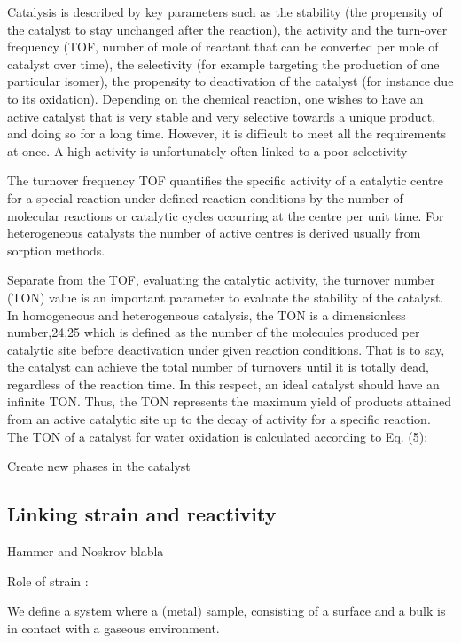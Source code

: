 Catalysis is described by key parameters such as the stability (the propensity of the catalyst to stay unchanged after the reaction), the activity and the turn-over frequency (TOF, number of mole of reactant that can be converted per mole of catalyst over time), the selectivity (for example targeting the production of one particular isomer), the propensity to deactivation of the catalyst (for instance due to its oxidation).
Depending on the chemical reaction, one wishes to have an active catalyst that is very stable and very selective towards a unique product, and doing so for a long time.
However, it is difficult to meet all the requirements at once.
A high activity is unfortunately often linked to a poor selectivity


The turnover frequency TOF quantifies the specific activity of a catalytic centre for a special reaction under defined reaction conditions by the number of molecular reactions or catalytic cycles occurring at the centre per unit time.
For heterogeneous catalysts the number of active centres is derived usually from sorption methods.

Separate from the TOF, evaluating the catalytic activity, the turnover number (TON) value is an important parameter to evaluate the stability of the catalyst. In homogeneous and heterogeneous catalysis, the TON is a dimensionless number,24,25 which is defined as the number of the molecules produced per catalytic site before deactivation under given reaction conditions.
That is to say, the catalyst can achieve the total number of turnovers until it is totally dead, regardless of the reaction time. In this respect, an ideal catalyst should have an infinite TON.
Thus, the TON represents the maximum yield of products attained from an active catalytic site up to the decay of activity for a specific reaction.
The TON of a catalyst for water oxidation is calculated according to Eq. (5):

Create new phases in the catalyst

\subsection{Linking strain and reactivity}



Hammer and Noskrov blabla


Role of strain :

\cite{Kitchin2004}

\cite{Mavrikakis1998}

We define a system where a (metal) sample, consisting of a surface and a bulk is in contact with a gaseous environment.

